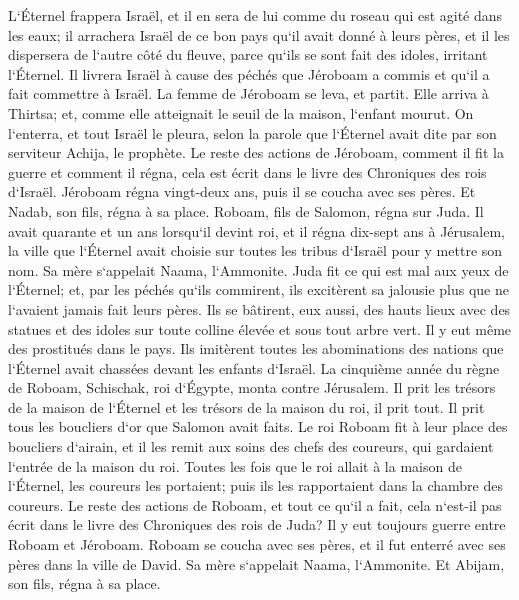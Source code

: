 \verse L`Éternel frappera Israël, et il en sera de lui comme du roseau qui est agité dans les eaux; il arrachera Israël de ce bon pays qu`il avait donné à leurs pères, et il les dispersera de l`autre côté du fleuve, parce qu`ils se sont fait des idoles, irritant l`Éternel. 
\verse Il livrera Israël à cause des péchés que Jéroboam a commis et qu`il a fait commettre à Israël. 
\verse La femme de Jéroboam se leva, et partit. Elle arriva à Thirtsa; et, comme elle atteignait le seuil de la maison, l`enfant mourut. 
\verse On l`enterra, et tout Israël le pleura, selon la parole que l`Éternel avait dite par son serviteur Achija, le prophète. 
\verse Le reste des actions de Jéroboam, comment il fit la guerre et comment il régna, cela est écrit dans le livre des Chroniques des rois d`Israël. 
\verse Jéroboam régna vingt-deux ans, puis il se coucha avec ses pères. Et Nadab, son fils, régna à sa place. 
\verse Roboam, fils de Salomon, régna sur Juda. Il avait quarante et un ans lorsqu`il devint roi, et il régna dix-sept ans à Jérusalem, la ville que l`Éternel avait choisie sur toutes les tribus d`Israël pour y mettre son nom. Sa mère s`appelait Naama, l`Ammonite. 
\verse Juda fit ce qui est mal aux yeux de l`Éternel; et, par les péchés qu`ils commirent, ils excitèrent sa jalousie plus que ne l`avaient jamais fait leurs pères. 
\verse Ils se bâtirent, eux aussi, des hauts lieux avec des statues et des idoles sur toute colline élevée et sous tout arbre vert. 
\verse Il y eut même des prostitués dans le pays. Ils imitèrent toutes les abominations des nations que l`Éternel avait chassées devant les enfants d`Israël. 
\verse La cinquième année du règne de Roboam, Schischak, roi d`Égypte, monta contre Jérusalem. 
\verse Il prit les trésors de la maison de l`Éternel et les trésors de la maison du roi, il prit tout. Il prit tous les boucliers d`or que Salomon avait faits. 
\verse Le roi Roboam fit à leur place des boucliers d`airain, et il les remit aux soins des chefs des coureurs, qui gardaient l`entrée de la maison du roi. 
\verse Toutes les fois que le roi allait à la maison de l`Éternel, les coureurs les portaient; puis ils les rapportaient dans la chambre des coureurs. 
\verse Le reste des actions de Roboam, et tout ce qu`il a fait, cela n`est-il pas écrit dans le livre des Chroniques des rois de Juda? 
\verse Il y eut toujours guerre entre Roboam et Jéroboam. 
\verse Roboam se coucha avec ses pères, et il fut enterré avec ses pères dans la ville de David. Sa mère s`appelait Naama, l`Ammonite. Et Abijam, son fils, régna à sa place. 

